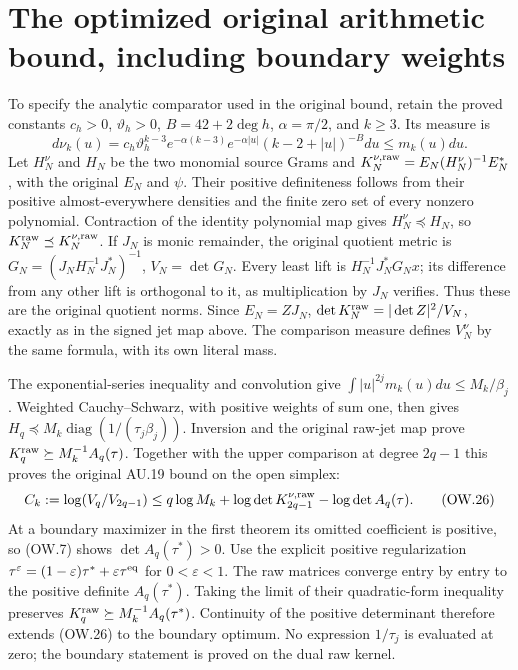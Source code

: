 \documentclass[11pt]{article}
\newcommand{\diag}{\operatorname{diag}}
\begin{document}
\section{The optimized original arithmetic bound, including boundary weights}

To specify the analytic comparator used in the original bound, retain
the proved constants $c_h>0$, $\vartheta_h>0$, $B=42+2\deg h$,
$\alpha=\pi/2$, and $k\ge3$. Its measure is
\[
 d\nu_k(u)=c_h\vartheta_h^{k-3}e^{-\alpha(k-3)}
       e^{-\alpha|u|}(k-2+|u|)^{-B}du\le m_k(u)du.
 \tag{OW.25}
\]
Let $H_N^\nu$ and $H_N$ be the two monomial source Grams and
$K_N^{\nu,\rm raw}=E_N(H_N^\nu)^{-1}E_N^*$, with the
original $E_N$ and $\psi$. Their positive definiteness follows
from their positive almost-everywhere densities and the finite
zero set of every nonzero polynomial. Contraction of the identity
polynomial map gives $H_N^\nu\preceq H_N$, so
$K_N^{\rm raw}\preceq K_N^{\nu,\rm raw}$.
If $J_N$ is monic remainder, the original quotient metric is
$G_N=(J_NH_N^{-1}J_N^*)^{-1}$, $V_N=\det G_N$.
Every least lift is $H_N^{-1}J_N^*G_Nx$; its difference from any
other lift is orthogonal to it, as multiplication by $J_N$ verifies.
Thus these are the original quotient norms. Since $E_N=ZJ_N$,
$\det K_N^{\rm raw}=|\det Z|^2/V_N$, exactly as in the signed
jet map above. The comparison measure defines $V_N^\nu$ by the
same formula, with its own literal mass.

The exponential-series inequality and convolution give
$\int|u|^{2j}m_k(u)du\le M_k/\beta_j$.
Weighted Cauchy--Schwarz, with positive weights of sum one,
then gives $H_q\preceq M_k\diag(1/(\tau_j\beta_j))$.
Inversion and the original raw-jet map prove
$K_q^{\rm raw}\succeq M_k^{-1}A_q(\tau)$.
Together with the upper comparison at degree $2q-1$ this proves
the original AU.19 bound on the open simplex:
\[
 C_k:=\log(V_q/V_{2q-1})
 \le q\log M_k+\log\det K_{2q-1}^{\nu,\rm raw}
                    -\log\det A_q(\tau).               \tag{OW.26}
\]
At a boundary maximizer in the first theorem its omitted coefficient
is positive, so (OW.7) shows $\det A_q(\tau^*)>0$.
Use the explicit positive regularization
$\tau^\varepsilon=(1-\varepsilon)\tau^*
+\varepsilon\tau^{\rm eq}$ for $0<\varepsilon<1$.
The raw matrices converge entry by entry to the positive definite
$A_q(\tau^*)$. Taking the limit of their quadratic-form inequality
preserves $K_q^{\rm raw}\succeq M_k^{-1}A_q(\tau^*)$.
Continuity of the positive determinant therefore extends (OW.26)
to the boundary optimum. No expression $1/\tau_j$ is evaluated
at zero; the boundary statement is proved on the dual raw kernel.
\end{document}
